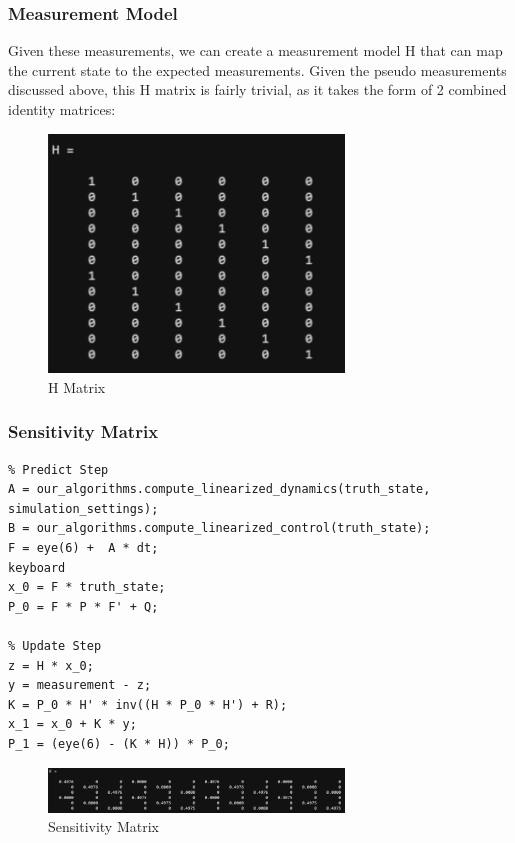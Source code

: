 \subsubsection{Measurement Model}
Given these measurements, we can create a measurement model H that can map the current state to the expected measurements. Given the pseudo measurements discussed above, this H matrix is fairly trivial, as it takes the form of 2 combined identity matrices:

\begin{figure}[H]
    \centering
    \includegraphics[width=0.7\textwidth]{PS7/Figures/Screenshot 2025-05-19 224040.png}
    \caption{H Matrix}
    \label{fig:H Matrix}
\end{figure}


\subsubsection{Sensitivity Matrix}

\begin{lstlisting}
% Predict Step
A = our_algorithms.compute_linearized_dynamics(truth_state, simulation_settings);
B = our_algorithms.compute_linearized_control(truth_state);
F = eye(6) +  A * dt;
keyboard
x_0 = F * truth_state;
P_0 = F * P * F' + Q;

% Update Step
z = H * x_0;
y = measurement - z;
K = P_0 * H' * inv((H * P_0 * H') + R);
x_1 = x_0 + K * y;
P_1 = (eye(6) - (K * H)) * P_0;
\end{lstlisting}

\begin{figure}[H]
    \centering
    \includegraphics[width=0.7\textwidth]{PS7/Figures/Screenshot 2025-05-20 143614.png}
    \caption{Sensitivity Matrix}
    \label{fig:Sensitivity Matrix}
\end{figure}